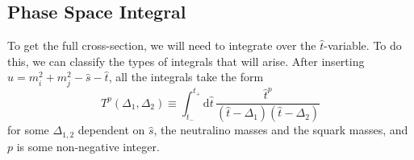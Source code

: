 \documentclass[../main.tex]{subfiles}
\begin{document}
\subsection{Phase Space Integral}
To get the full cross-section, we will need to integrate over the \(\hat{t}\)-variable.
To do this, we can classify the types of integrals that will arise.
After inserting \(\hat{u} = m_i^2 + m_j^2 - \hat{s} - \hat{t}\), all the integrals take the form
\begin{equation}
  T^p(\Delta_1, \Delta_2) \equiv \int_{t_-}^{t_+} \!\mathrm{d}\hat{t}\,
  \frac{\hat{t}^p}{(\hat{t}-\Delta_1)(\hat{t}-\Delta_2)}
\end{equation}
for some \(\Delta_{1,2}\) dependent on \(\hat{s}\), the neutralino masses and
the squark masses, and \(p\) is some non-negative integer.
\end{document}
